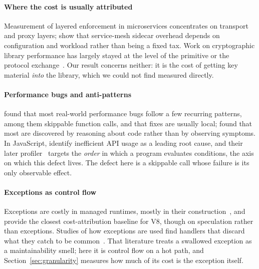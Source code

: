 \documentclass[preprint,12pt,authoryear]{elsarticle}
\begin{document}
\paragraph{Where the cost is usually attributed} Measurement of layered
enforcement in microservices concentrates on transport and proxy layers;
\citet{zhu2023dissecting} show that service-mesh sidecar overhead depends on
configuration and workload rather than being a fixed tax. Work on
cryptographic library performance has largely stayed at the level of the
primitive or the protocol
exchange~\citep{naser2020performance,sikeridis2020assessing}. Our result
concerns neither: it is the cost of getting key material \emph{into} the
library, which we could not find measured directly.

\paragraph{Performance bugs and anti-patterns} \citet{jin2012understanding}
found that most real-world performance bugs follow a few recurring patterns,
among them skippable function calls, and that fixes are usually local;
\citet{nistor2013discovering} found that most are discovered by reasoning about
code rather than by observing symptoms. In JavaScript,
\citet{selakovic2016performance} identify inefficient API usage as a leading
root cause, and their later profiler~\citep{selakovic2017actionable} targets the
\emph{order} in which a program evaluates conditions, the axis on which this
defect lives. The defect here is a skippable call whose failure is its only
observable effect.

\paragraph{Exceptions as control flow} Exceptions are costly in managed
runtimes, mostly in their construction~\citep{ogasawara2006edo}, and
\citet{parravicini2021cost} provide the closest cost-attribution baseline for
V8, though on speculation rather than exceptions. Studies of how exceptions are used find handlers that discard what they
catch to be common~\citep{cabral2007exception,kery2016examining,depadua2017prevalence}.
That literature treats a swallowed exception as a maintainability smell; here
it is control flow on a hot path, and Section~\ref{sec:granularity} measures
how much of its cost is the exception itself.
\end{document}
